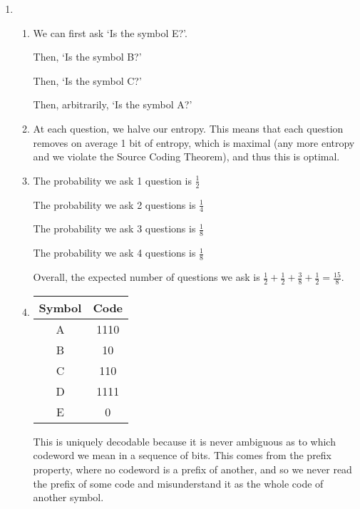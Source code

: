 


\begin{enumerate}[label=(\alph*)]
    \item
        \begin{enumerate}[label=(\roman*)]
            \item
                We can first ask `Is the symbol E?'.

                Then, `Is the symbol B?'

                Then, `Is the symbol C?'

                Then, arbitrarily, `Is the symbol A?'

            \item
                At each question, we halve our entropy. This means that each question removes on average 1 bit of entropy, which is maximal (any more entropy and we violate the Source Coding Theorem), and thus this is optimal.

            \item
                The probability we ask 1 question is $\frac{1}{2}$

                The probability we ask 2 questions is $\frac{1}{4}$

                The probability we ask 3 questions is $\frac{1}{8}$

                The probability we ask 4 questions is $\frac{1}{8}$

                Overall, the expected number of questions we ask is $\frac{1}{2} + \frac{1}{2} + \frac{3}{8} + \frac{1}{2} = \frac{15}{8}$.

            \item
                \begin{tabular}{cc}
                    Symbol&Code\\
                    \hline
                    A&1110\\
                    B&10\\
                    C&110\\
                    D&1111\\
                    E&0
                    
                \end{tabular}

                This is uniquely decodable because it is never ambiguous as to which codeword we mean in a sequence of bits. This comes from the prefix property, where no codeword is a prefix of another, and so we never read the prefix of some code and misunderstand it as the whole code of another symbol.


\end{enumerate}
\end{enumerate}
